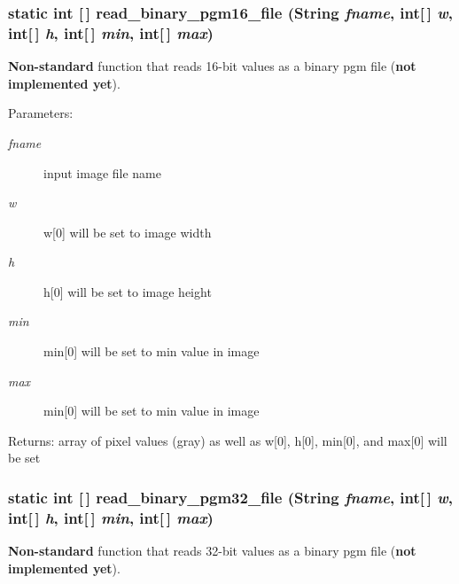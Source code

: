 \subsubsection{\setlength{\rightskip}{0pt plus 5cm}static int [$\,$] read\_\-binary\_\-pgm16\_\-file (String {\em fname}, int[$\,$] {\em w}, int[$\,$] {\em h}, int[$\,$] {\em min}, int[$\,$] {\em max})\hspace{0.3cm}{\tt  [static]}}\label{class_c_s_image_viewer_1_1pnm_helper_1e7365b006549d4971e267f5378e3290}


{\bf Non-standard} function that reads 16-bit values as a binary pgm file ({\bf not implemented yet}). 

\begin{Desc}
\item[Parameters:]
\begin{description}
\item[{\em fname}]input image file name \item[{\em w}]w[0] will be set to image width \item[{\em h}]h[0] will be set to image height \item[{\em min}]min[0] will be set to min value in image \item[{\em max}]min[0] will be set to min value in image\end{description}
\end{Desc}
\begin{Desc}
\item[Returns:]array of pixel values (gray) as well as w[0], h[0], min[0], and max[0] will be set \end{Desc}
\subsubsection{\setlength{\rightskip}{0pt plus 5cm}static int [$\,$] read\_\-binary\_\-pgm32\_\-file (String {\em fname}, int[$\,$] {\em w}, int[$\,$] {\em h}, int[$\,$] {\em min}, int[$\,$] {\em max})\hspace{0.3cm}{\tt  [static]}}\label{class_c_s_image_viewer_1_1pnm_helper_f442d2c5f29538b8846cf9f5315a5f43}


{\bf Non-standard} function that reads 32-bit values as a binary pgm file ({\bf not implemented yet}). 

